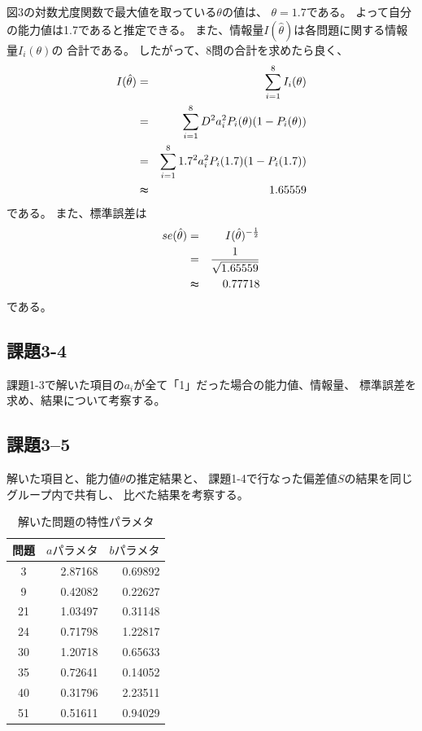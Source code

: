 \documentclass[12pt]{jarticle}
\begin{document}
図3の対数尤度関数で最大値を取っている$\theta$の値は、
$\theta=1.7$である。
よって自分の能力値は1.7であると推定できる。
また、情報量$I(\hat{\theta})$は各問題に関する情報量$I_i({\theta})$の
合計である。
したがって、8問の合計を求めたら良く、
\begin{eqnarray*}
    I(\hat{\theta})&=&\sum_{i=1}^{8}{I_i({\theta})}\\
    &=&\sum_{i=1}^{8}{D^2a_i^2P_i(\theta)(1-P_i(\theta))}\\
    &=&\sum_{i=1}^{8}{1.7^2a_i^2P_i(1.7)(1-P_i(1.7))}\\
    &\thickapprox & 1.65559
\end{eqnarray*}
である。
\clearpage
また、標準誤差は
\begin{eqnarray*}
    se(\hat{\theta})&=&I(\hat{\theta})^{-\frac{1}{2}}\\
    &= &\frac{1}{\sqrt{ 1.65559}}\\
    &\thickapprox& 0.77718
\end{eqnarray*}
である。

\subsection{課題3-4}
\begin{shadebox}
    課題1-3で解いた項目の$a_i$が全て「1」だった場合の能力値、情報量、
    標準誤差を求め、結果について考察する。
\end{shadebox}


\subsection{課題3–5}
\begin{shadebox}
    解いた項目と、能力値$\theta$の推定結果と、
    課題1-4で行なった偏差値$S$の結果を同じグループ内で共有し、
    比べた結果を考察する。
\end{shadebox}


\begin{table}[htb]
    \begin{center}
        \caption{解いた問題の特性パラメタ}
        \begin{tabular}{|c|r|r|}
            \hline
            問題 & $aパラメタ$ & $bパラメタ$ \\
            \hline
            3    & 2.87168     & 0.69892     \\
            9    & 0.42082     & 0.22627     \\
            21   & 1.03497     & 0.31148     \\
            24   & 0.71798     & 1.22817     \\
            30   & 1.20718     & 0.65633     \\
            35   & 0.72641     & 0.14052     \\
            40   & 0.31796     & 2.23511     \\
            51   & 0.51611     & 0.94029     \\
            \hline
        \end{tabular}
    \end{center}
\end{table}
\end{document}

